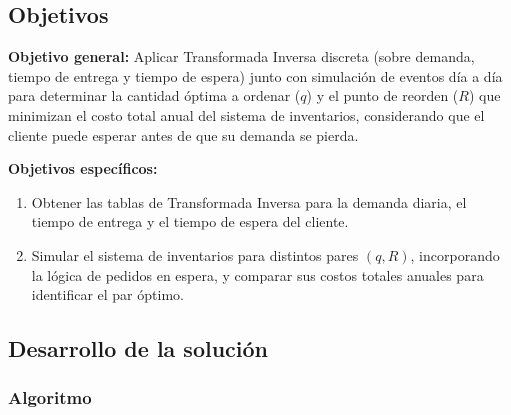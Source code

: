\documentclass[12pt, a4paper]{article}
\begin{document}
\subsection{Objetivos}

\textbf{Objetivo general:} Aplicar Transformada Inversa discreta (sobre demanda, tiempo de entrega y tiempo de espera) junto con simulación de eventos día a día para determinar la cantidad óptima a ordenar ($q$) y el punto de reorden ($R$) que minimizan el costo total anual del sistema de inventarios, considerando que el cliente puede esperar antes de que su demanda se pierda.

\textbf{Objetivos específicos:}
\begin{enumerate}
    \item Obtener las tablas de Transformada Inversa para la demanda diaria, el tiempo de entrega y el tiempo de espera del cliente.
    \item Simular el sistema de inventarios para distintos pares $(q, R)$, incorporando la lógica de pedidos en espera, y comparar sus costos totales anuales para identificar el par óptimo.
\end{enumerate}

\subsection{Desarrollo de la solución}

\subsubsection{Algoritmo}
\end{document}
